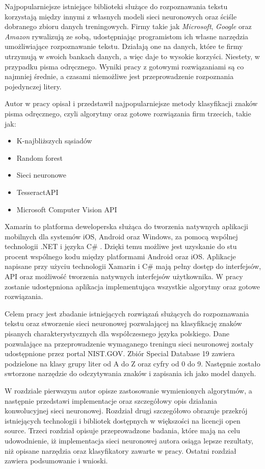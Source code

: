 \documentclass[brudnopis]{xmgr}
\begin{document}
	Najpopularniejsze istniejące biblioteki służące do rozpoznawania tekstu korzystają między innymi z własnych modeli sieci neuronowych oraz ściśle dobranego zbioru danych treningowych. Firmy takie jak \emph{Microsoft}, \emph{Google} oraz \emph{Amazon} rywalizują ze sobą, udostępniając programistom ich własne narzędzia umożliwiające rozpoznawanie tekstu. Działają one na danych, które te firmy utrzymują w swoich bankach danych, a więc daje to wysokie korzyści. Niestety, w przypadku pisma odręcznego. Wyniki pracy z gotowymi rozwiązaniami są co najmniej średnie, a czasami niemożliwe jest przeprowadzenie rozpoznania pojedynczej litery.
	
	Autor w pracy opisał i przedstawił najpopularniejsze metody klasyfikacji znaków pisma odręcznego, czyli algorytmy oraz gotowe rozwiązania firm trzecich, takie jak:
\begin{itemize}
\item
K-najbliższych sąsiadów
\item
Random forest
\item
Sieci neuronowe
\item
TesseractAPI
\item
Microsoft Computer Vision API
\end{itemize}
\newpage

	Xamarin\cite{15} to platforma deweloperska służąca do tworzenia natywnych aplikacji mobilnych dla systemów iOS, Android oraz Windows, za pomocą wspólnej technologii .NET i języka C\#\cite{4} . Dzięki temu możliwe jest uzyskanie do stu procent wspólnego kodu między platformami Android oraz iOS. Aplikacje napisane przy użyciu technologii Xamarin\cite{15} i C\# mają pełny dostęp do interfejsów\cite{20}, API oraz możliwość tworzenia natywnych interfejsów użytkownika. W pracy zostanie udostępniona aplikacja implementująca wszystkie algorytmy oraz gotowe rozwiązania.
  
  Celem pracy jest  zbadanie istniejących rozwiązań służących do rozpoznawania tekstu oraz stworzenie sieci neuronowej pozwalającej na klasyfikację znaków pisanych charakterystycznych dla współczesnego języka polskiego. Dane pozwalające na przeprowadzenie wymaganego treningu sieci neuronowej zostały udostępnione przez portal NIST.GOV\cite{7}. Zbiór Special Database 19 zawiera podzielone na klasy grupy liter od A do Z oraz cyfry od 0 do 9. Następnie zostało swtorzone narzędzie do odczytywania znaków i zapisania ich jako model danych\cite{2}.
  
  W rozdziale pierwszym autor opisze zastosowanie wymienionych algorytmów, a następnie przedstawi implementacje oraz szczegółowy opis działania konwolucyjnej sieci neuronowej. Rozdział drugi szczegółowo obrazuje przekrój istniejących technologii i bibliotek dostępnych w większości na licencji open source. Trzeci rozdział opisuje przeprowadzone badania, które mają na celu udowodnienie, iż implementacja sieci neuronowej autora osiąga lepsze rezultaty, niż opisane narzędzia oraz klasyfikatory zawarte w pracy. Ostatni rozdział zawiera podsumowanie i wnioski.
\end{document}
